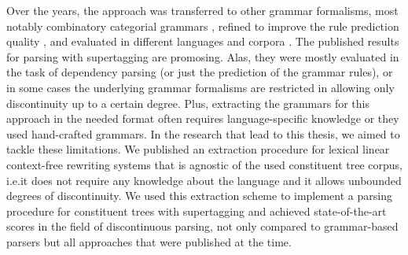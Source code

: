 \documentclass[../document.tex]{subfiles}
\begin{document}
    Over the years, the approach was transferred to other grammar formalisms, most notably combinatory categorial grammars \citep{Clark04}, refined to improve the rule prediction quality \citep{vaswani2016supertagging,Kad18,tian20}, and evaluated in different languages and corpora \citep{Bla18}.
    The published results for parsing with supertagging are promosing.
    Alas, they were mostly evaluated in the task of dependency parsing (or just the prediction of the grammar rules), or in some cases the underlying grammar formalisms are restricted in allowing only discontinuity up to a certain degree.
    Plus, extracting the grammars for this approach in the needed format often requires language-specific knowledge \citep{Kas17,Bla18} or they used hand-crafted grammars. \citep{Hoc07}
    In the research that lead to this thesis, we aimed to tackle these limitations.
    We published an extraction procedure for lexical linear context-free rewriting systems that is agnostic of the used constituent tree corpus, i.e.\@ it does not require any knowledge about the language and it allows unbounded degrees of discontinuity. \citep{MoeRup20}
    We used this extraction scheme to implement a parsing procedure for constituent trees with supertagging and achieved state-of-the-art scores in the field of discontinuous parsing, not only compared to grammar-based parsers but all approaches that were published at the time. \citep{RupMoe21,Rup22}
    
\end{document}
